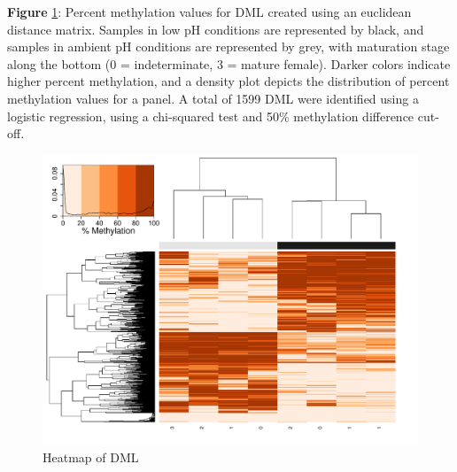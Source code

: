 \documentclass [11pt, proquest] {uwthesis}[2015/03/03]
\begin{document}
\textbf{Figure} \ref{fig:femheatmap}: Percent methylation values for DML created using an euclidean distance matrix. Samples in low pH conditions are represented by black, and samples in ambient pH conditions are represented by grey, with maturation stage along the bottom (0 = indeterminate, 3 = mature female). Darker colors indicate higher percent methylation, and a density plot depicts the distribution of percent methylation values for a panel. A total of 1599 DML were identified using a logistic regression, using a chi-squared test and 50\% methylation difference cut-off.\newline 
\begin{figure}[h]
\centering
  \includegraphics[width=1\textwidth]{figure/Ch3/Figure3.2.pdf}
  \caption{Heatmap of DML}
  \label{fig:femheatmap}
\end{figure}
\clearpage
\end{document}
